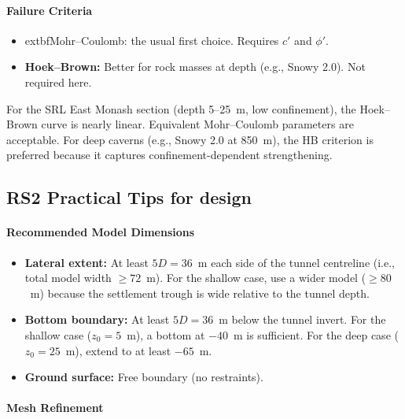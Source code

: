 \paragraph{Failure Criteria}
\begin{itemize}
 \item 	extbf{Mohr--Coulomb:} the usual first choice. Requires $c'$ and $\phi'$.
 \item \textbf{Hoek--Brown:} Better for rock masses at depth (e.g., Snowy 2.0). Not required here.
\end{itemize}

\begin{notebox}
For the SRL East Monash section (depth 5--25~m, low confinement), the Hoek--Brown curve is nearly linear. Equivalent Mohr--Coulomb parameters are acceptable. For deep caverns (e.g., Snowy 2.0 at 850~m), the HB criterion is preferred because it captures confinement-dependent strengthening.
\end{notebox}

\subsection{RS2 Practical Tips for design}

\paragraph{Recommended Model Dimensions}
\begin{itemize}
 \item \textbf{Lateral extent:} At least $5D = 36$~m each side of the tunnel centreline (i.e., total model width $\geq 72$~m). For the shallow case, use a wider model ($\geq 80$~m) because the settlement trough is wide relative to the tunnel depth.
 \item \textbf{Bottom boundary:} At least $5D = 36$~m below the tunnel invert. For the shallow case ($z_0=5$~m), a bottom at $-40$~m is sufficient. For the deep case ($z_0=25$~m), extend to at least $-65$~m.
 \item \textbf{Ground surface:} Free boundary (no restraints).
\end{itemize}

\paragraph{Mesh Refinement}

